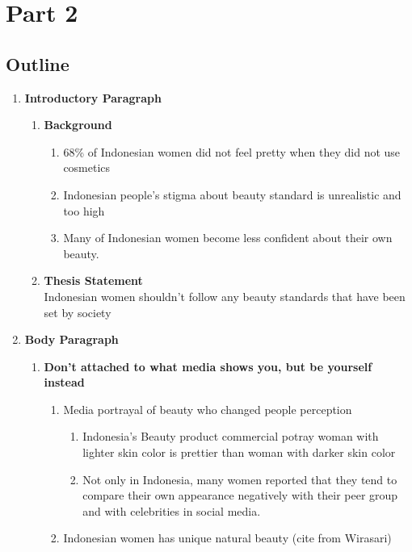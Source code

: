 \documentclass[12pt]{article}
\begin{document}
    \pagebreak
    \section*{Part 2}
    \subsection*{Outline}
    \begin{enumerate}[label*=\arabic*.]
    \item {\large\textbf{Introductory Paragraph}}
        \begin{enumerate}[label*=\arabic*.]
        \item \textbf{Background}
            \begin{enumerate}
            \item 68\% of Indonesian women did not feel pretty when they did not use cosmetics
            \item Indonesian people's stigma about beauty standard is unrealistic and too high
            \item Many of Indonesian women become less confident about their own beauty.
            \end{enumerate}
        \item \textbf{Thesis Statement} \\
        Indonesian women shouldn't follow any beauty standards that have been set by society
        \end{enumerate}
    \item {\large\textbf{Body Paragraph}}
        \begin{enumerate}[label*=\arabic*.]
        \item \textbf{Don't attached to what media shows you, but be yourself instead}
            \begin{enumerate}[label*=\arabic*.]
            \item Media portrayal of beauty who changed people perception
                \begin{enumerate}[label*=\arabic*.]
                \item Indonesia's Beauty product commercial potray woman with lighter skin color is prettier than woman with darker skin color
                \item Not only in Indonesia, many women reported that they tend to compare their own appearance negatively with their peer group and with celebrities in social media.
                \end{enumerate}
            \item Indonesian women has unique natural beauty (cite from Wirasari)

\end{enumerate}
\end{enumerate}
\end{enumerate}
\end{document}
